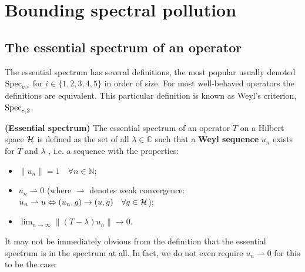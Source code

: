 \documentclass[../main.tex]{subfiles}
\begin{document}
\section{Bounding spectral pollution}

\subsection{The essential spectrum of an operator}
The essential spectrum has several definitions, 
the most popular usually denoted $\mathrm{Spec}_{e,i}$ for $i \in \{1,2,3,4,5\}$ in order of size. For 
most well-behaved operators the definitions are equivalent. This particular definition 
is known as Weyl's criterion, $\mathrm{Spec}_{e, 2}$. \cite{edmunds2018spectral}

\begin{definition}{\textbf{(Essential spectrum)}}
The essential spectrum of an operator $T$ on a Hilbert space $\mathcal{H}$ 
is defined as the set of all $\lambda \in \mathbb{C}$ such that a \textbf{Weyl sequence} $u_n$ exists for $T$ and $\lambda$ , i.e. a sequence with the properties:
\begin{itemize}
\item $\|u_n\| = 1\quad \forall n \in \mathbb{N}$;
\item $u_n \rightharpoonup 0$ (where $\rightharpoonup$ denotes weak convergence: $u_n \rightharpoonup u \Leftrightarrow (u_n, g) \rightarrow (u, g) \quad \forall g \in \mathcal{H}$);
\item $\lim_{n \rightarrow \infty}\|(T - \lambda)u_n\|  \rightarrow 0$.
\end{itemize}
\end{definition}

It may not be immediately obvious from the definition that the essential spectrum is in the spectrum at all. In fact, we do not even require $u_n \rightharpoonup 0$ for this to be the case:
\end{document}
